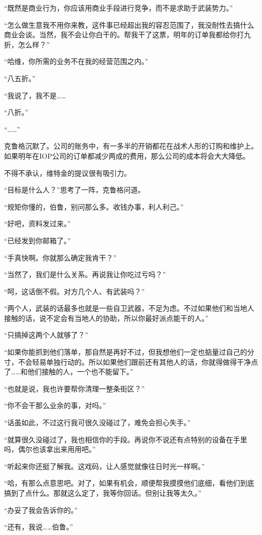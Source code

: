 “既然是商业行为，你应该用商业手段进行竞争，而不是求助于武装势力。”

“怎么做生意我不用你来教，这件事已经超出我的容忍范围了，我没耐性去搞什么商业会谈。当然，我不会让你白干的。帮我干了这票，明年的订单我都给你打九折，怎么样？”

“哈维，你所需的业务不在我的经营范围之内。”

“八五折。”

“我说了，我不是……

“八折。”

“……”

克鲁格沉默了。公司的账务中，有一多半的开销都花在战术人形的订购和维护上。如果明年在IOP公司的订单都减少两成的费用，那么公司的成本将会大大降低。

不得不承认，维特金的提议很有吸引力。

“目标是什么人？”思考了一阵，克鲁格问道。

“规矩你懂的，伯鲁，别问那么多。收钱办事，利人利己。”

“好吧，资料发过来。”

“已经发到你邮箱了。”

“手真快啊。你就那么确定我肯干？”

“当然了，我们是什么关系。再说我让你吃过亏吗？”

“呵，这话倒不假。对方几个人、有武装吗？”

“两个人，武装的话最多也就是一些自卫武器，不足为虑。不过如果他们和当地人接触的话，说不定会有当地人的协助，所以你最好派点能干的人。”

“只搞掉这两个人就够了？”

“如果你能抓到他们落单，那自然是再好不过，但我想他们一定也掂量过自己的分寸，不会轻易单独行动的。所以如果他们跟前还有其他人的话，你就得做得干净点了……和他们接触的人，一个也不能留下。”

“也就是说，我也许要帮你清理一整条街区？”

“你不会干那么业余的事，对吗。”

“话虽如此，不过这行我可很久没碰过了，难免会担心失手。”

“就算很久没碰过了，我也相信你的手段。再说你不说还有点特别的设备在手里吗，偶尔也该拿出来用用吧。”

“听起来你还挺了解我。这戏码，让人感觉就像往日时光一样啊。”

“哈，有那么点意思吧。对了，如果有机会，顺便帮我摸摸他们底细，看他们到底搞到了点什么。那就这么定了，我等你回话。但别让我等太久。”

“办妥了我会告诉你的。”

“还有，我说……伯鲁。”

